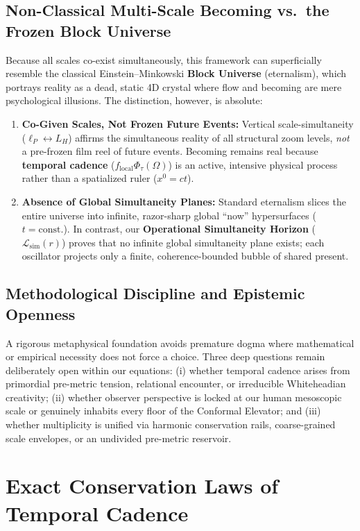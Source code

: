\documentclass[11pt,a4paper]{article}
\begin{document}
\subsection{Non-Classical Multi-Scale Becoming vs.\ the Frozen Block Universe}
Because all scales co-exist simultaneously, this framework can superficially resemble the classical Einstein--Minkowski \textbf{Block Universe} (eternalism), which portrays reality as a dead, static 4D crystal where flow and becoming are mere psychological illusions. The distinction, however, is absolute:
\begin{enumerate}
    \item \textbf{Co-Given Scales, Not Frozen Future Events:} Vertical scale-simultaneity ($\ell_P \leftrightarrow L_H$) affirms the simultaneous reality of all structural zoom levels, \emph{not} a pre-frozen film reel of future events. Becoming remains real because \textbf{temporal cadence} ($f_{\mathrm{local}}\Phi_\tau(\Omega)$) is an active, intensive physical process rather than a spatialized ruler ($x^0 = ct$).
    \item \textbf{Absence of Global Simultaneity Planes:} Standard eternalism slices the entire universe into infinite, razor-sharp global ``now'' hypersurfaces ($t = \mathrm{const.}$). In contrast, our \textbf{Operational Simultaneity Horizon} ($\mathcal{L}_{\mathrm{sim}}(r)$) proves that no infinite global simultaneity plane exists; each oscillator projects only a finite, coherence-bounded bubble of shared present.
\end{enumerate}

\subsection{Methodological Discipline and Epistemic Openness}
A rigorous metaphysical foundation avoids premature dogma where mathematical or empirical necessity does not force a choice. Three deep questions remain deliberately open within our equations: (i) whether temporal cadence arises from primordial pre-metric tension, relational encounter, or irreducible Whiteheadian creativity; (ii) whether observer perspective is locked at our human mesoscopic scale or genuinely inhabits every floor of the Conformal Elevator; and (iii) whether multiplicity is unified via harmonic conservation rails, coarse-grained scale envelopes, or an undivided pre-metric reservoir.

\section{Exact Conservation Laws of Temporal Cadence}
\end{document}
